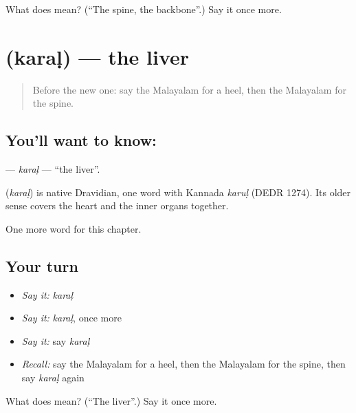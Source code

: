 \begin{tcolorbox}[breakable,colback=teal!4,colframe=teal!35!black,title={Before you move on}]
What does  mean? (\textquotedblleft{}The spine, the backbone\textquotedblright{}.) Say it once more.
\end{tcolorbox}
\section[\texorpdfstring{\ml{കരൾ} (karaḷ)}{കരൾ (karaḷ)}]{ (karaḷ) — the liver}

\label{lesson:ML-C235-karal}



\begin{quote}
Before the new one: say the Malayalam for a heel, then the Malayalam for the spine.
\end{quote}

\subsection*{You'll want to know: }
\textbf{} — \emph{karaḷ} — \textquotedblleft{}the liver\textquotedblright{}.

\begin{cousinweb}
\textbf{} (\emph{karaḷ}) is native Dravidian, one word with Kannada \emph{karuḷ} (DEDR 1274). Its older sense covers the heart and the inner organs together.
\end{cousinweb}

\begin{grammarlens}[title={What you've built}]
One more word for this chapter.
\end{grammarlens}

\subsection*{Your turn}
\begin{itemize}
\raggedright
  \item \emph{Say it:} \emph{karaḷ}
  \item \emph{Say it:} \emph{karaḷ}, once more
  \item \emph{Say it:} say \emph{karaḷ}
  \item \emph{Recall:} say the Malayalam for a heel, then the Malayalam for the spine, then say \emph{karaḷ} again
\end{itemize}

\begin{tcolorbox}[breakable,colback=teal!4,colframe=teal!35!black,title={Before you move on}]
What does  mean? (\textquotedblleft{}The liver\textquotedblright{}.) Say it once more.
\end{tcolorbox}
